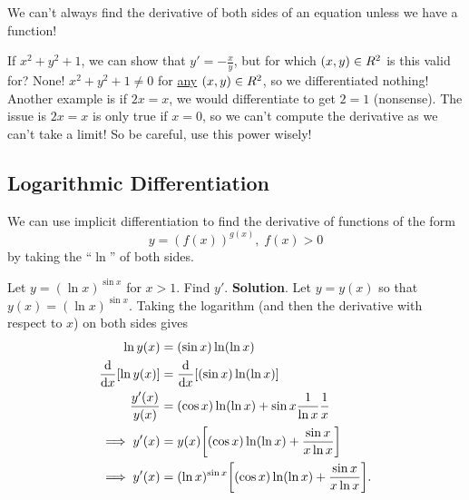 \begin{Remark}{}{}
    We can't always find the derivative of both sides of an equation unless we have a function!
\end{Remark}
\begin{Example}{}{}
    If $ x^2+y^2+1 $, we can show that $ y'=-\frac{x}{y} $, but for which $ (x,y)\in\relax{R}^2 $ is this valid for? None!
    $ x^2+y^2+1\ne 0 $ for \underline{any} $ (x,y)\in \relax{R}^2 $, so we differentiated nothing! Another example is
    if $ 2x=x $, we would differentiate to get $ 2=1 $ (nonsense). The issue is
    $ 2x=x $ is only true if $ x=0 $, so we can't compute the derivative as we can't take a limit! So be careful, use this power wisely!
\end{Example}
\subsection*{Logarithmic Differentiation}
We can use implicit differentiation to find the derivative of functions of the form
\[ y=(f(x))^{g(x)},\; f(x)>0 \]
by taking the ``$ \ln $'' of both sides.
\begin{Example}{}{}
    Let $ y=(\ln x)^{\sin x} $ for $ x>1 $. Find $ y' $.
    \tcblower{}
    \textbf{Solution}. Let $ y=y(x) $ so that $ y(x)=(\ln x)^{\sin x} $.
    Taking the logarithm (and then the derivative with respect to $ x $) on both sides gives
    \begin{align*}
        \ln y(x)             & =(\sin x) \ln(\ln x)                                                      \\
        \odv*{[\ln y(x)]}{x} & =\odv*{[(\sin x) \ln(\ln x)]}{x}                                          \\
        \frac{y'(x)}{y(x)}   & =(\cos x)\ln(\ln x)+\sin x \frac{1}{\ln x}\frac{1}{x}                     \\
        \implies y'(x)       & =y(x)\biggl[(\cos x)\ln(\ln x)+ \frac{\sin x}{x\ln x}\biggr]              \\
        \implies y'(x)       & =(\ln x)^{\sin x}\biggl[(\cos x)\ln(\ln x)+ \frac{\sin x}{x\ln x}\biggr].
    \end{align*}
\end{Example}
